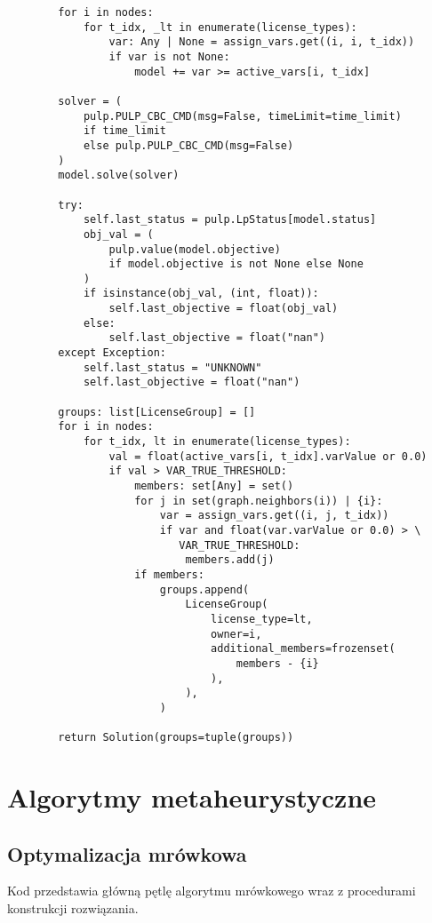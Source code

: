 {\begin{verbatim}
        for i in nodes:
            for t_idx, _lt in enumerate(license_types):
                var: Any | None = assign_vars.get((i, i, t_idx))
                if var is not None:
                    model += var >= active_vars[i, t_idx]

        solver = (
            pulp.PULP_CBC_CMD(msg=False, timeLimit=time_limit)
            if time_limit
            else pulp.PULP_CBC_CMD(msg=False)
        )
        model.solve(solver)

        try:
            self.last_status = pulp.LpStatus[model.status]
            obj_val = (
                pulp.value(model.objective)
                if model.objective is not None else None
            )
            if isinstance(obj_val, (int, float)):
                self.last_objective = float(obj_val)
            else:
                self.last_objective = float("nan")
        except Exception:
            self.last_status = "UNKNOWN"
            self.last_objective = float("nan")

        groups: list[LicenseGroup] = []
        for i in nodes:
            for t_idx, lt in enumerate(license_types):
                val = float(active_vars[i, t_idx].varValue or 0.0)
                if val > VAR_TRUE_THRESHOLD:
                    members: set[Any] = set()
                    for j in set(graph.neighbors(i)) | {i}:
                        var = assign_vars.get((i, j, t_idx))
                        if var and float(var.varValue or 0.0) > \
                           VAR_TRUE_THRESHOLD:
                            members.add(j)
                    if members:
                        groups.append(
                            LicenseGroup(
                                license_type=lt,
                                owner=i,
                                additional_members=frozenset(
                                    members - {i}
                                ),
                            ),
                        )

        return Solution(groups=tuple(groups))
\end{verbatim}
    }

\section{Algorytmy metaheurystyczne}
\subsection{Optymalizacja mrówkowa}
Kod przedstawia główną pętlę algorytmu mrówkowego wraz z
procedurami konstrukcji rozwiązania.

